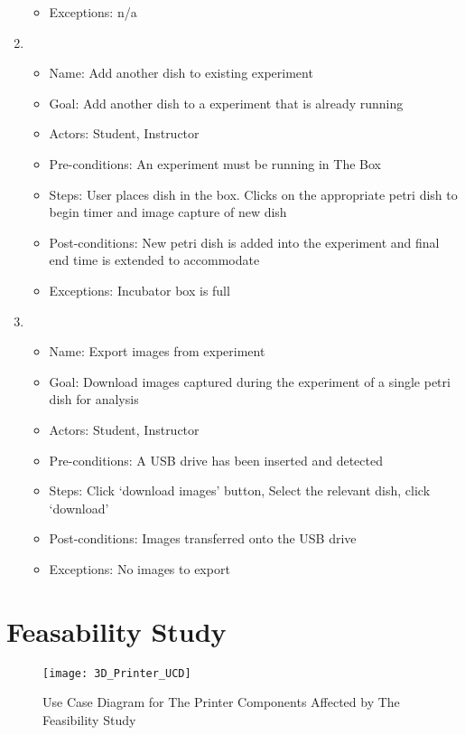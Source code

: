 \begin{enumerate}
\begin{itemize}
		\item Exceptions: n/a
	\end{itemize}
	\item 
	\begin{itemize}
		\item Name: Add another dish to existing experiment
		\item Goal: Add another dish to a experiment that is already running 
		\item Actors:  Student, Instructor
		\item Pre-conditions: An experiment must be running in The Box
		\item Steps: User places dish in the box. Clicks on the appropriate petri dish to begin timer and image capture of new dish
		\item Post-conditions: New petri dish is added into the experiment and final end time is extended to accommodate 
		\item Exceptions: Incubator box is full
	\end{itemize}
	\item 
	\begin{itemize}
		\item Name: Export images from experiment
		\item Goal: Download images captured during the experiment of a single petri dish for analysis
		\item Actors:  Student, Instructor
		\item Pre-conditions: A USB drive has been inserted and detected
		\item Steps: Click `download images' button, Select the relevant dish, click `download'
		\item Post-conditions: Images transferred onto the USB drive
		\item Exceptions: No images to export
	\end{itemize}
\end{enumerate}

\section{Feasability Study}

\begin{figure}[H]
\texttt{[image: 3D\_Printer\_UCD]}
\caption{\label{figure:3D_Printer_UCD} Use Case Diagram for The Printer Components Affected by The Feasibility Study}
\end{figure}

